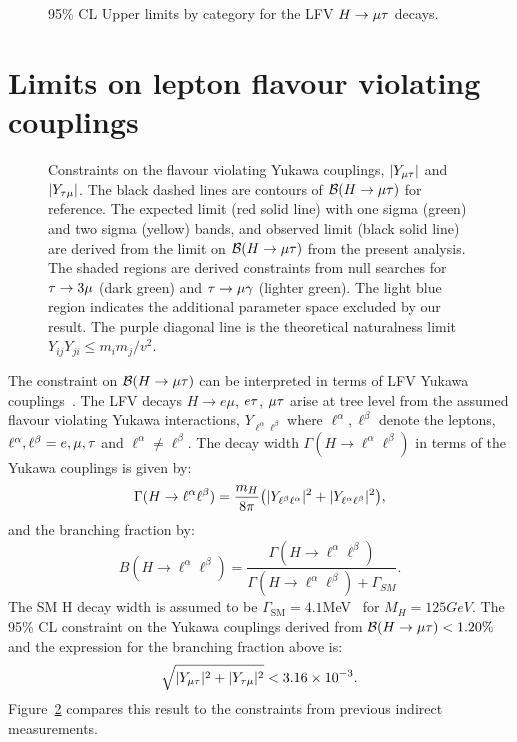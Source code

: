 \documentclass[oneside, letterpaper, oldfontcommands]{memoir}
\DeclarePairedDelimiter{\abs}{\lvert}{\rvert}
\begin{document}
{{{\begin{figure}[hbtp]\centering
 \caption{95\% CL Upper limits by category for the LFV $H \rightarrow \mu \mathrm{\tau}$  decays.}
 \label{fig:limits_summary}\end{figure}

\section{Limits on lepton flavour violating couplings}
\begin{figure}[hbt]\centering
 \caption{Constraints on the flavour violating Yukawa couplings, $\abs{Y_{\mu\Pgt}}$ and $\abs{Y_{\Pgt\mu}}$.
The black dashed lines are contours of $\mathcal{B}(H \rightarrow \mu \mathrm{\tau} )$ for reference.
The expected limit (red solid line) with one sigma (green)  and two sigma (yellow) bands, and observed limit (black solid line) are derived from the limit on $\mathcal{B}(H \rightarrow \mu \mathrm{\tau} )$ from the present analysis.  The shaded regions are derived constraints from null searches for $\mathrm{\tau} \rightarrow 3\mu$ (dark green) and $\mathrm{\tau} \rightarrow \mu \gamma$ (lighter green).
The light blue region indicates the additional parameter space excluded by our result.
The purple diagonal line is the theoretical naturalness
limit $Y_{ij}Y_{ji} \leq m_im_j/v^2$. }
 \label{fig:yukawalimits}\end{figure}



The constraint on $\mathcal{B}(H \rightarrow \mu \mathrm{\tau} )$ can be interpreted in terms of LFV  Yukawa couplings~\cite{Harnik:2012pb}.
The LFV decays $H \rightarrow e\mu$, $e\mathrm{\tau}$, $\mu\mathrm{\tau}$ arise at tree level from the assumed
flavour violating Yukawa interactions, $Y_{\ell^{\alpha}\ell^{\beta}}$ where $\ell^{\alpha},\ell^{\beta}$ denote the leptons, $\ell^{\alpha},\ell^{\beta}=e,\mu,\mathrm{\tau}$ and $\ell^{\alpha}\neq \ell^{\beta}$.
The decay width $\Gamma(H \rightarrow \ell^{\alpha}\ell^{\beta})$  in terms of the Yukawa couplings is given by:
\begin{equation*}
\Gamma(H \rightarrow \ell^{\alpha}\ell^{\beta})=\frac{m_{H}}{8\pi}\bigl(\abs{Y_{\ell^{\beta}\ell^{\alpha}}}^2 + \abs{Y_{\ell^{\alpha}\ell^{\beta}}}^2\bigr),
\end{equation*}
and the branching fraction by:
\begin{equation*}
B(H \rightarrow \ell^{\alpha}\ell^{\beta})=\frac{\Gamma(H\rightarrow \ell^{\alpha}\ell^{\beta})}{\Gamma(H\rightarrow \ell^{\alpha}\ell^{\beta}) + \Gamma_{SM}}.
\end{equation*}
The SM H decay width is assumed to be $\Gamma_{\mathrm{SM}}=4.1$MeV~\cite{Denner:2011mq} for $M_{H}=125GeV$.
The 95\% CL constraint on the Yukawa couplings derived from $\mathcal{B}(H \rightarrow \mu \mathrm{\tau} )<1.20\%$ and the expression for the branching fraction above is:\begin{equation*}
\sqrt{\abs{Y_{\mu\Pgt}}^{2}+\abs{Y_{\Pgt\mu}}^{2}}<3.16\times 10^{-3}.
\end{equation*}
Figure~\ref{fig:yukawalimits} compares this result to the constraints from previous indirect
measurements.

}}}
\end{document}
